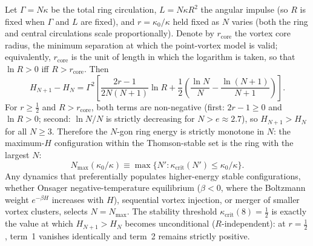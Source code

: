 \begin{proposition}
\label{prop:onsager-n-select}
Let $\Gamma = N\kappa$ be the total ring circulation, $L = N\kappa R^2$
the angular impulse (so $R$ is fixed when $\Gamma$ and $L$ are fixed),
and $r = \kappa_0/\kappa$ held fixed as $N$ varies (both the ring and
central circulations scale proportionally).  Denote by
$r_{\mathrm{core}}$ the vortex core radius, the minimum separation at
which the point-vortex model is valid; equivalently, $r_{\mathrm{core}}$
is the unit of length in which the logarithm is taken, so that
$\ln R > 0$ iff $R > r_{\mathrm{core}}$.  Then
\begin{equation}\label{eq:H-monotone}
  H_{N+1} - H_N = \Gamma^2\!\left[\frac{2r-1}{2N(N+1)}\ln R
    + \frac12\!\left(\frac{\ln N}{N} - \frac{\ln(N+1)}{N+1}\right)\right].
\end{equation}
For $r \ge \tfrac{1}{2}$ and $R > r_{\mathrm{core}}$, both terms
are non-negative (first: $2r - 1 \ge 0$ and $\ln R > 0$; second:
$\ln N/N$ is strictly decreasing for $N > e \approx 2.7$), so
$H_{N+1} > H_N$ for all $N \ge 3$.  Therefore the $N$-gon ring
energy is strictly monotone in $N$: the maximum-$H$ configuration
within the Thomson-stable set is the ring with the largest $N$:
\[
  N_{\max}(\kappa_0/\kappa)
    \equiv \max\bigl\{N' : \kappa_{\mathrm{crit}}(N') \le \kappa_0/\kappa\bigr\}.
\]
Any dynamics that preferentially populates higher-energy stable
configurations, whether Onsager negative-temperature equilibrium
($\beta < 0$, where the Boltzmann weight $e^{-\beta H}$ increases
with $H$), sequential vortex injection, or merger of smaller vortex
clusters, selects $N = N_{\max}$.  The stability threshold
$\kappa_{\mathrm{crit}}(8) = \tfrac{1}{2}$ is exactly the value at
which $H_{N+1} > H_N$ becomes unconditional ($R$-independent): at
$r = \tfrac{1}{2}$, term~1 vanishes identically and term~2 remains
strictly positive.
\end{proposition}

